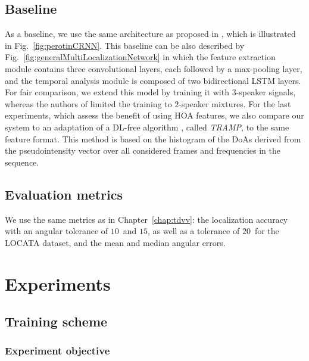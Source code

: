 \subsection{Baseline}

As a baseline, we use the same architecture as proposed in \cite{perotin_crnn-based_2019}, which is illustrated in Fig.~\ref{fig:perotinCRNN}. This baseline can be also described by Fig.~\ref{fig:generalMultiLocalizationNetwork} in which the feature extraction module contains three convolutional layers, each followed by a max-pooling layer, and the temporal analysis module is composed of two bidirectional LSTM layers. For fair comparison, we extend this model by training it with $3$-speaker signals, whereas the authors of \cite{perotin_crnn-based_2019} limited the training to $2$-speaker mixtures. For the last experiments, which assess the benefit of using HOA features, we also compare our system to an adaptation of a DL-free algorithm \cite{kitic_tramp:_2018}, called \textit{TRAMP}, to the same feature format. This method is based on the histogram of the DoAs derived from the pseudointensity vector over all considered frames and frequencies in the sequence.

\subsection{Evaluation metrics}

We use the same metrics as in Chapter~\ref{chap:tdvv}: the localization accuracy with an angular tolerance of $10$\textdegree~and $15$\textdegree, as well as a tolerance of $20$\textdegree~for the LOCATA dataset, and the mean and median angular errors.

\section{Experiments}

\subsection{Training scheme}
\label{ss:trainingOrder}
\subsubsection{Experiment objective}

